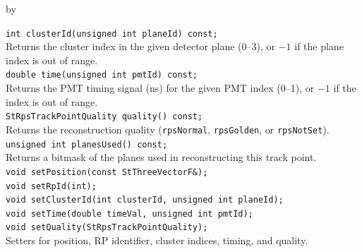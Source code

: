\documentclass[twoside]{article}
\newcommand{\entrylabel}[1]{\mbox{\textbf{{#1}}}\hfil}%
\newenvironment{entry}
{\begin{list}{}%
    {\renewcommand{\makelabel}{\entrylabel}%
     \setlength{\labelwidth}{90pt}%
     \setlength{\leftmargin}{\labelwidth}
     \advance\leftmargin by \labelsep%
      }%
    }%
  {\end{list}}
\newcommand{\Entrylabel}[1]%
{\raisebox{0pt}[1ex][0pt]{\makebox[\labelwidth][l]%
    {\parbox[t]{\labelwidth}{\hspace{0pt}\textbf{{#1}}}}}}
\newenvironment{Entry}%
{\renewcommand{\entrylabel}{\Entrylabel}\begin{entry}}%
  {\end{entry}}
\begin{document}
\begin{Entry}
    \verb+int clusterId(unsigned int planeId) const;+\\
    Returns the cluster index in the given detector plane (0--3), or $-1$
    if the plane index is out of range.\\
    \verb+double time(unsigned int pmtId) const;+\\
    Returns the PMT timing signal (ns) for the given PMT index (0--1), or
    $-1$ if the index is out of range.\\
    \verb+StRpsTrackPointQuality quality() const;+\\
    Returns the reconstruction quality (\texttt{rpsNormal}, \texttt{rpsGolden},
    or \texttt{rpsNotSet}).\\
    \verb+unsigned int planesUsed() const;+\\
    Returns a bitmask of the planes used in reconstructing this track point.\\
    \verb+void setPosition(const StThreeVectorF&);+\\
    \verb+void setRpId(int);+\\
    \verb+void setClusterId(int clusterId, unsigned int planeId);+\\
    \verb+void setTime(double timeVal, unsigned int pmtId);+\\
    \verb+void setQuality(StRpsTrackPointQuality);+\\
    Setters for position, RP identifier, cluster indices, timing, and quality.\\
\end{Entry}
\clearpage

\end{document}
